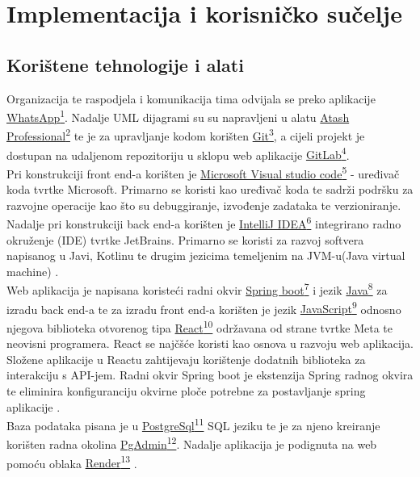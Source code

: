 \chapter{Implementacija i korisničko sučelje}
		
		
		\section{Korištene tehnologije i alati}
		
			
			 {Organizacija te raspodjela i komunikacija tima odvijala se preko aplikacije \underline{WhatsApp\textsuperscript{1}}. Nadalje UML dijagrami su su napravljeni u alatu \underline{Atash Professional\textsuperscript{2}} te je za upravljanje kodom korišten \underline{Git\textsuperscript{3}}, a cijeli projekt je dostupan na udaljenom repozitoriju u sklopu web aplikacije \underline{GitLab\textsuperscript{4}}}.\\
			
			
			{Pri konstrukciji front end-a korišten je \underline{Microsoft Visual studio code\textsuperscript{5}} - uređivač koda  tvrtke Microsoft. Primarno se koristi kao uređivač koda te sadrži podršku za razvojne operacije kao što su debuggiranje, izvođenje zadataka te verzioniranje. Nadalje pri konstrukciji back end-a korišten  je \underline{IntelliJ IDEA\textsuperscript{6}} integrirano radno okruženje (IDE) tvrtke JetBrains. Primarno se koristi za razvoj softvera napisanog u Javi, Kotlinu te drugim jezicima temeljenim na JVM-u(Java virtual machine) }.\\
			
			{Web aplikacija je napisana koristeći radni okvir \underline{Spring boot\textsuperscript{7}} i jezik \underline{Java\textsuperscript{8}} za izradu back end-a te za izradu front end-a korišten je jezik \underline{JavaScript\textsuperscript{9}}  odnosno njegova biblioteka otvorenog tipa  \underline{React\textsuperscript{10}} održavana od strane tvrtke Meta te neovisni programera. React se najčšće  koristi kao osnova u razvoju web aplikacija. Složene aplikacije u Reactu  zahtijevaju korištenje dodatnih biblioteka za interakciju s API-jem. Radni okvir Spring boot je ekstenzija Spring radnog okvira te eliminira konfiguranciju okvirne ploče potrebne za postavljanje spring aplikacije }.\\
			
			{Baza podataka pisana je u \underline{PostgreSql\textsuperscript{11}} SQL jeziku te je za njeno kreiranje korišten radna okolina \underline{PgAdmin\textsuperscript{12}}. Nadalje aplikacija je podignuta na web pomoću oblaka \underline{Render\textsuperscript{13}}  }.
			
